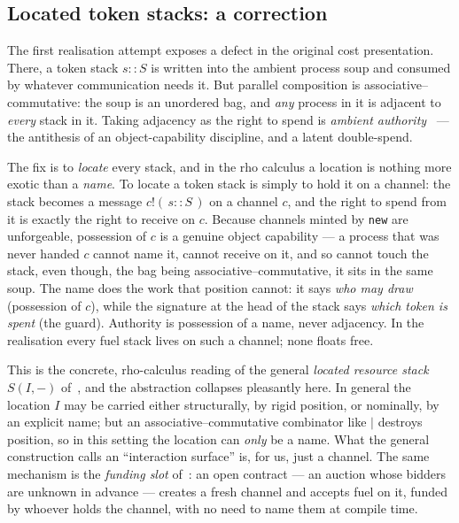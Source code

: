 \documentclass[11pt]{article}
\theoremstyle{definition}
\theoremstyle{plain}
\begin{document}
\subsection{Located token stacks: a correction}\label{sec:located}

The first realisation attempt exposes a defect in the original cost presentation. There, a token
stack $s :: S$ is written into the ambient process soup and consumed by whatever communication needs
it. But parallel composition is associative--commutative: the soup is an unordered bag, and
\emph{any} process in it is adjacent to \emph{every} stack in it. Taking adjacency as the right to
spend is \emph{ambient authority}~\cite{Miller2006} --- the antithesis of an object-capability
discipline, and a latent double-spend.

The fix is to \emph{locate} every stack, and in the rho calculus a location is nothing more exotic
than a \emph{name}. To locate a token stack is simply to hold it on a channel: the stack becomes a
message $c!(\,s :: S\,)$ on a channel $c$, and the right to spend from it is exactly the right to
receive on $c$. Because channels minted by \texttt{new} are unforgeable, possession of $c$ is a
genuine object capability --- a process that was never handed $c$ cannot name it, cannot receive on
it, and so cannot touch the stack, even though, the bag being associative--commutative, it sits in the
same soup. The name does the work that position cannot: it says \emph{who may draw} (possession of
$c$), while the signature at the head of the stack says \emph{which token is spent} (the guard).
Authority is possession of a name, never adjacency. In the realisation every fuel stack lives on such
a channel; none floats free.

This is the concrete, rho-calculus reading of the general \emph{located resource stack}
$S(I,-)$ of~\cite[\S10.4]{CGC2026}, and the abstraction collapses pleasantly here. In general the
location $I$ may be carried either structurally, by rigid position, or nominally, by an explicit name;
but an associative--commutative combinator like $\mid$ destroys position, so in this setting the
location can \emph{only} be a name. What the general construction calls an ``interaction surface'' is,
for us, just a channel. The same mechanism is the \emph{funding slot} of~\cite[\S5.7]{CAR2026}: an
open contract --- an auction whose bidders are unknown in advance --- creates a fresh channel and
accepts fuel on it, funded by whoever holds the channel, with no need to name them at compile time.
\end{document}
